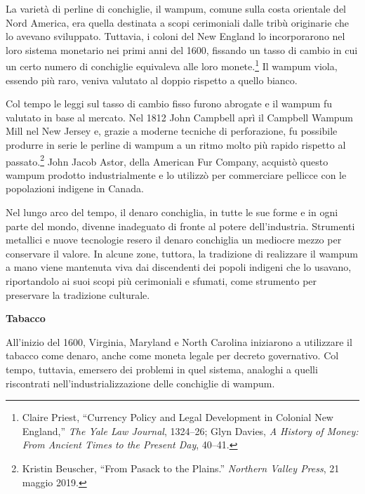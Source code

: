 \documentclass[
  a5paper,
  smalldemyvopaper,10pt,twoside,onecolumn,openright,extrafontsizes,hidelinks]{memoir}
\begin{document}
La varietà di perline di conchiglie, il wampum, comune sulla costa
orientale del Nord America, era quella destinata a scopi cerimoniali
dalle tribù originarie che lo avevano sviluppato. Tuttavia, i coloni del
New England lo incorporarono nel loro sistema monetario nei primi anni
del 1600, fissando un tasso di cambio in cui un certo numero di
conchiglie equivaleva alle loro monete.\footnote{Claire Priest,
  ``Currency Policy and Legal Development in Colonial New England,''
  \emph{The Yale Law Journal}, 1324--26; Glyn Davies, \emph{A History of
  Money: From Ancient Times to the Present Day}, 40--41.} Il wampum
viola, essendo più raro, veniva valutato al doppio rispetto a quello
bianco.

Col tempo le leggi sul tasso di cambio fisso furono abrogate e il wampum
fu valutato in base al mercato. Nel 1812 John Campbell aprì il Campbell
Wampum Mill nel New Jersey e, grazie a moderne tecniche di perforazione,
fu possibile produrre in serie le perline di wampum a un ritmo molto più
rapido rispetto al passato.\footnote{Kristin Beuscher, ``From Pasack to
  the Plains.'' \emph{Northern Valley Press}, 21 maggio 2019.} John
Jacob Astor, della American Fur Company, acquistò questo wampum prodotto
industrialmente e lo utilizzò per commerciare pellicce con le
popolazioni indigene in Canada.

Nel lungo arco del tempo, il denaro conchiglia, in tutte le sue forme e
in ogni parte del mondo, divenne inadeguato di fronte al potere
dell'industria. Strumenti metallici e nuove tecnologie resero il denaro
conchiglia un mediocre mezzo per conservare il valore. In alcune zone,
tuttora, la tradizione di realizzare il wampum a mano viene mantenuta
viva dai discendenti dei popoli indigeni che lo usavano, riportandolo ai
suoi scopi più cerimoniali e sfumati, come strumento per preservare la
tradizione culturale.

\textbf{Tabacco}

All'inizio del 1600, Virginia, Maryland e North Carolina iniziarono a
utilizzare il tabacco come denaro, anche come moneta legale per decreto
governativo. Col tempo, tuttavia, emersero dei problemi in quel sistema,
analoghi a quelli riscontrati nell'industrializzazione delle conchiglie
di wampum.
\end{document}
